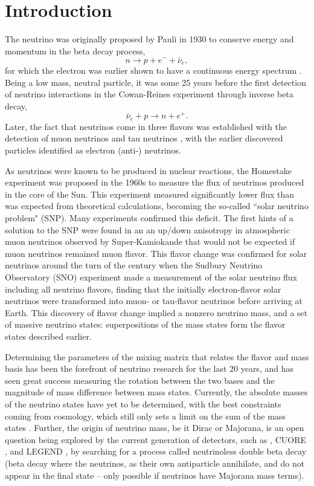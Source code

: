 \chapter{Introduction}
The neutrino was originally proposed by Pauli in 1930 \cite{pauli} to conserve energy and momentum in the beta decay process,
\begin{equation}
n \rightarrow p + e^- + \bar{\nu}_e,
\end{equation}
for which the electron was earlier shown to have a continuous energy spectrum \cite{chadwick}.
Being a low mass, neutral particle, it was some 25 years before the first detection of neutrino interactions in the Cowan-Reines experiment \cite{cowan-reines} through inverse beta decay,
\begin{equation}
\bar{\nu}_e + p \rightarrow n + e^+.
\end{equation}
Later, the fact that neutrinos come in three flavors was established with the detection of muon neutrinos \cite{danby} and tau neutrinos \cite{donut}, with the earlier discovered particles identified as electron (anti-) neutrinos.

As neutrinos were known to be produced in nuclear reactions, the Homestake experiment \cite{homestake} was proposed in the 1960s to measure the flux of neutrinos produced in the core of the Sun.
This experiment measured significantly lower flux than was expected from theoretical calculations, becoming the so-called ``solar neutrino problem" (SNP).
Many experiments \cite{sage,gallex,gno} confirmed this deficit.
The first hints of a solution to the SNP were found in an an up/down anisotropy in atmospheric muon neutrinos observed by Super-Kamiokande \cite{superk} that would not be expected if muon neutrinos remained muon flavor. 
This flavor change was confirmed for solar neutrinos around the turn of the century when the Sudbury Neutrino Observatory (SNO) experiment \cite{3phase} made a measurement of the solar neutrino flux including all neutrino flavors, finding that the initially electron-flavor solar neutrinos were transformed into muon- or tau-flavor neutrinos before arriving at Earth.
This discovery of flavor change implied a nonzero neutrino mass, and a set of massive neutrino states: superpositions of the mass states form the flavor states described earlier.

Determining the parameters of the mixing matrix that relates the flavor and mass basis has been the forefront of neutrino research for the last 20 years, and has seen great success measuring the rotation between the two bases and the magnitude of mass difference between mass states. 
Currently, the absolute masses of the neutrino states have yet to be determined, with the best constraints coming from cosmology, which still only sets a limit on the sum of the mass states \cite{pdg}.
Further, the origin of neutrino mass, be it Dirac or Majorana, is an open question being explored by the current generation of detectors, such as {\snop} \cite{snop}, CUORE \cite{cuore}, and LEGEND \cite{legend}, by searching for a process called neutrinoless double beta decay (beta decay where the neutrinos, as their own antiparticle annihilate, and do not appear in the final state -- only possible if neutrinos have Majorana mass terms).

